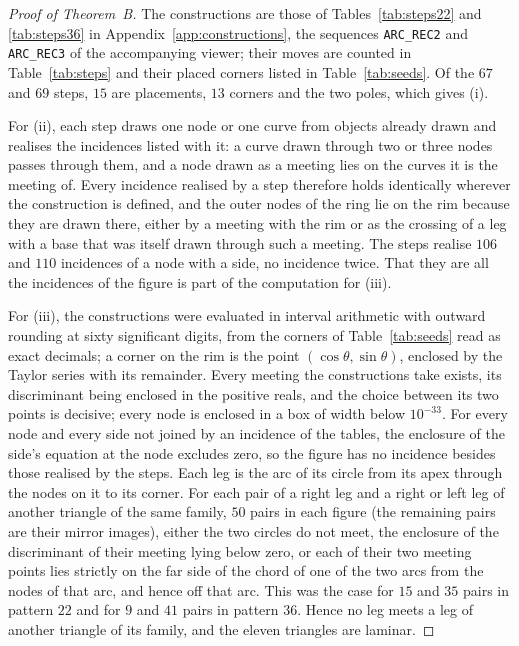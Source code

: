 \documentclass[11pt,a4paper]{article}
\theoremstyle{definition}
\theoremstyle{remark}
\begin{document}
\begin{proof}[Proof of Theorem~B]
The constructions are those of Tables~\ref{tab:steps22} and \ref{tab:steps36} in
Appendix~\ref{app:constructions}, the sequences \texttt{ARC\_REC2} and \texttt{ARC\_REC3} of the
accompanying viewer; their moves are counted in Table~\ref{tab:steps} and their placed corners listed in
Table~\ref{tab:seeds}. Of the $67$ and $69$ steps, $15$ are placements, $13$ corners and the two poles,
which gives (i).

For (ii), each step draws one node or one curve from objects already drawn and realises the incidences
listed with it: a curve drawn through two or three nodes passes through them, and a node drawn as a
meeting lies on the curves it is the meeting of. Every incidence realised by a step therefore holds
identically wherever the construction is defined, and the outer nodes of the ring lie on the rim because
they are drawn there, either by a meeting with the rim or as the crossing of a leg with a base that was
itself drawn through such a meeting. The steps realise $106$ and $110$ incidences of a node with a side, no
incidence twice. That they are all the incidences of the figure is part of the computation for (iii).

For (iii), the constructions were evaluated in interval arithmetic with outward rounding at sixty
significant digits, from the corners of Table~\ref{tab:seeds} read as exact decimals; a corner on the rim
is the point $(\cos\theta, \sin\theta)$, enclosed by the Taylor series with its remainder. Every meeting
the constructions take exists, its discriminant being enclosed in the positive reals, and the choice between
its two points is decisive; every node is enclosed in a box of width below $10^{-33}$. For every node and
every side not joined by an incidence of the tables, the enclosure of the side's equation at the node
excludes zero, so the figure has no incidence besides those realised by the steps. Each leg is the arc of
its circle from its apex through the nodes on it to its corner. For each pair of a right leg and a right or
left leg of another triangle of the same family, $50$ pairs in each figure (the remaining pairs are their
mirror images), either the two circles do not meet, the enclosure of the discriminant of their meeting
lying below zero, or each of their two meeting points lies strictly on the far side of the chord of one of
the two arcs from the nodes of that arc, and hence off that arc. This was the case for $15$ and $35$ pairs
in pattern $22$ and for $9$ and $41$ pairs in pattern $36$. Hence no leg meets a leg of another triangle of
its family, and the eleven triangles are laminar.
\end{proof}
\end{document}
